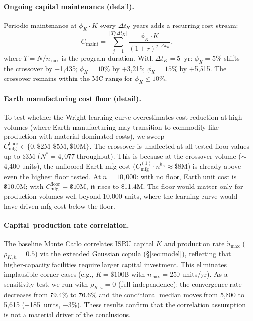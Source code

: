 \documentclass[preprint,12pt]{elsarticle}
\begin{document}
\paragraph{Ongoing capital maintenance (detail).} Periodic maintenance at $\phi_K \cdot K$ every $\Delta t_K$ years adds a recurring cost stream:
\begin{equation}
  C_{\mathrm{maint}} = \sum_{j=1}^{\lfloor T/\Delta t_K \rfloor} \frac{\phi_K \cdot K}{(1+r)^{j \cdot \Delta t_K}},
\end{equation}
where $T = N/\dot{n}_{\max}$ is the program duration. With $\Delta t_K = 5$~yr: $\phi_K = 5\%$ shifts the crossover by $+$1{,}435; $\phi_K = 10\%$ by $+$3{,}215; $\phi_K = 15\%$ by $+$5{,}515. The crossover remains within the MC range for $\phi_K \leq 10\%$.

\paragraph{Earth manufacturing cost floor (detail).} To test whether the Wright learning curve overestimates cost reduction at high volumes (where Earth manufacturing may transition to commodity-like production with material-dominated costs), we sweep $C_{\mathrm{mfg}}^{\mathrm{floor}} \in \{0, \$2\text{M}, \$5\text{M}, \$10\text{M}\}$. The crossover is unaffected at all tested floor values up to \$3M ($N^* = 4{,}077$ throughout). This is because at the crossover volume ($\sim$4{,}400 units), the unfloored Earth mfg cost ($C_{\mathrm{mfg}}^{(1)} \cdot n^{b_E} \approx \$8$M) is already above even the highest floor tested. At $n = 10{,}000$: with no floor, Earth unit cost is \$10.0M; with $C_{\mathrm{mfg}}^{\mathrm{floor}} = \$10$M, it rises to \$11.4M. The floor would matter only for production volumes well beyond 10{,}000 units, where the learning curve would have driven mfg cost below the floor.

\paragraph{Capital--production rate correlation.} The baseline Monte Carlo correlates ISRU capital $K$ and production rate $\dot{n}_{\max}$ ($\rho_{K,\dot{n}} = 0.5$) via the extended Gaussian copula (\S\ref{sec:model}), reflecting that higher-capacity facilities require larger capital investment. This eliminates implausible corner cases (e.g., $K = \$100$B with $\dot{n}_{\max} = 250$ units/yr). As a sensitivity test, we run with $\rho_{K,\dot{n}} = 0$ (full independence): the convergence rate decreases from 79.4\% to 76.6\% and the conditional median moves from 5{,}800 to 5{,}615 ($-$185~units, $-$3\%). These results confirm that the correlation assumption is not a material driver of the conclusions.
\end{document}
